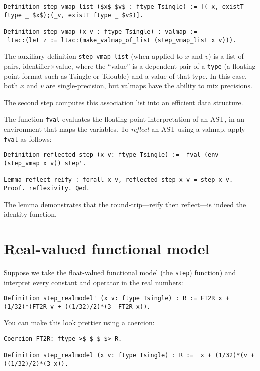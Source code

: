 \documentclass[article]{memoir}
\begin{document}
\begin{lstlisting}
Definition step_vmap_list ($x$ $v$ : ftype Tsingle) := [(_x, existT ftype _ $x$);(_v, existT ftype _ $v$)].

Definition step_vmap (x v : ftype Tsingle) : valmap :=
 ltac:(let z := ltac:(make_valmap_of_list (step_vmap_list x v))).
\end{lstlisting}
The auxiliary definition \lstinline{step_vmap_list}
(when applied to $x$ and $v$)
is a list of pairs, identifier$\times$value,
where the ``value'' is a dependent pair of a \lstinline{type} (a floating
point format such as Tsingle or Tdouble) and a value of that type.
In this case, both $x$ and $v$ are single-precision,
but valmaps have the ability to mix precisions.

The second step computes this association list into
an efficient data structure.

The function \lstinline{fval} evaluates the floating-point interpretation
of an AST, in an environment that maps the variables.
To \emph{reflect} an AST using a valmap, apply \lstinline{fval} as follows:

\begin{lstlisting}
Definition reflected_step (x v: ftype Tsingle) :=  fval (env_ (step_vmap x v)) step'.

Lemma reflect_reify : forall x v, reflected_step x v = step x v.
Proof. reflexivity. Qed.
\end{lstlisting}
The lemma demonstrates that the round-trip---reify then reflect---is indeed
the identity function.

\chapter{Real-valued functional model}
\label{realmodel}

Suppose we take the float-valued functional model (the \lstinline{step}) 
function) and interpret every constant and operator in the real numbers:

\begin{lstlisting}
Definition step_realmodel' (x v: ftype Tsingle) : R := FT2R x + (1/32)*(FT2R v + ((1/32)/2)*(3- FT2R x)).
\end{lstlisting}
You can make this look prettier using a coercion:

\begin{lstlisting}
Coercion FT2R: ftype >$ $-$ $> R.

Definition step_realmodel (x v: ftype Tsingle) : R :=  x + (1/32)*(v + ((1/32)/2)*(3-x)).
\end{lstlisting}
\end{document}
